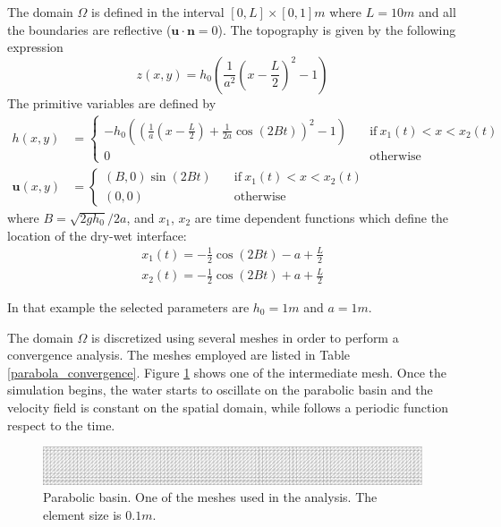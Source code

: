The domain $\Omega$ is defined in the interval $[0,L]\times[0,1]m$ where $L=10m$ and all the boundaries are reflective ($\mathbf{u}\cdot\mathbf{n} = 0$). The topography is given by the following expression
\begin{equation}
z(x,y) = h_0 \left(\frac{1}{a^2}\left(x - \frac{L}{2}\right)^2 - 1\right)
\end{equation}
The primitive variables are defined by
\begin{subequations}
\begin{align}
h(x,y) &=
\begin{cases}
-h_0\left(\left(\frac{1}{a}\left(x - \frac{L}{2}\right) + \frac{1}{2a}\cos(2Bt)\right)^2 - 1\right)
\quad &\text{if} \ x_1(t) < x < x_2(t) \\
0 \quad &\text{otherwise}
\end{cases} \\
\mathbf{u}(x,y) &=
\begin{cases}
(B,0)\sin(2Bt) \quad &\text{if} \ x_1(t) < x < x_2(t) \\
(0,0) \quad &\text{otherwise}
\end{cases}
\end{align}
\end{subequations}
where $B=\sqrt{2gh_0}/2a$, and $x_1$, $x_2$ are time dependent functions which define the location of the dry-wet interface:
\begin{equation}
\begin{split}
x_1(t) = -\frac{1}{2}\cos(2Bt) - a + \frac{L}{2} \\
x_2(t) = -\frac{1}{2}\cos(2Bt) + a + \frac{L}{2}
\end{split}
\end{equation}

In that example the selected parameters are $h_0=1m$ and $a=1m$.

The domain $\Omega$ is discretized using several meshes in order to perform a convergence analysis. The meshes employed are listed in Table \ref{parabola_convergence}. Figure \ref{parabola_mesh} shows one of the intermediate mesh. Once the simulation begins, the water starts to oscillate on the parabolic basin and the velocity field is constant on the spatial domain, while follows a periodic function respect to the time.

\begin{figure}
    \includegraphics[width=\textwidth]{img/eulerian/par/mesh_0.1.pdf}
    \caption{Parabolic basin. One of the meshes used in the analysis. The element size is $0.1m$.}
    \label{parabola_mesh}
\end{figure}

